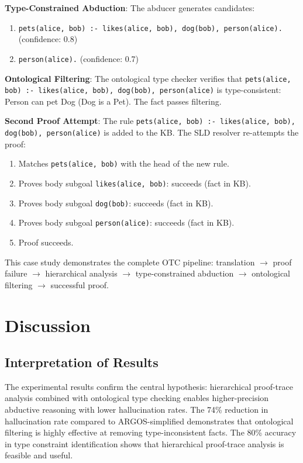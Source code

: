 \documentclass[11pt,letterpaper]{article}
\begin{document}
\textbf{Type-Constrained Abduction}: The abducer generates candidates:
\begin{enumerate}
  \item \texttt{pets(alice, bob) :- likes(alice, bob), dog(bob), person(alice).} (confidence: 0.8)
  \item \texttt{person(alice).} (confidence: 0.7)
\end{enumerate}

\textbf{Ontological Filtering}: The ontological type checker verifies that \texttt{pets(alice, bob) :- likes(alice, bob), dog(bob), person(alice)} is type-consistent: Person can pet Dog (Dog is a Pet). The fact passes filtering.

\textbf{Second Proof Attempt}: The rule \texttt{pets(alice, bob) :- likes(alice, bob), dog(bob), person(alice)} is added to the KB. The SLD resolver re-attempts the proof:
\begin{enumerate}
  \item Matches \texttt{pets(alice, bob)} with the head of the new rule.
  \item Proves body subgoal \texttt{likes(alice, bob)}: succeeds (fact in KB).
  \item Proves body subgoal \texttt{dog(bob)}: succeeds (fact in KB).
  \item Proves body subgoal \texttt{person(alice)}: succeeds (fact in KB).
  \item Proof succeeds.
\end{enumerate}

This case study demonstrates the complete OTC pipeline: translation $\rightarrow$ proof failure $\rightarrow$ hierarchical analysis $\rightarrow$ type-constrained abduction $\rightarrow$ ontological filtering $\rightarrow$ successful proof.

\section{Discussion}

\subsection{Interpretation of Results}

The experimental results confirm the central hypothesis: hierarchical proof-trace analysis combined with ontological type checking enables higher-precision abductive reasoning with lower hallucination rates. The 74\% reduction in hallucination rate compared to ARGOS-simplified demonstrates that ontological filtering is highly effective at removing type-inconsistent facts. The 80\% accuracy in type constraint identification shows that hierarchical proof-trace analysis is feasible and useful.
\end{document}
